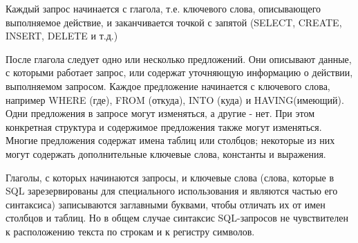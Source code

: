 \documentclass[12pt,a4paper,oneside]{article} %
\begin{document}
Каждый запрос начинается с глагола, т.е. ключевого слова, \linebreak
описывающего выполняемое действие, и заканчивается точкой \linebreak
с запятой (SELECT, CREATE, INSERT, DELETE и т.д.)

После глагола следует одно или несколько предложений. Они описывают \linebreak
данные, с которыми работает запрос, или содержат уточняющую \linebreak
информацию о действии, выполняемом запросом. Каждое \linebreak
предложение начинается с ключевого слова, например WHERE (где), \linebreak
FROM (откуда), INTO (куда) и HAVING(имеющий). Одни предложения \linebreak
в запросе могут изменяться, а другие - нет. При этом конкретная \linebreak
структура и содержимое предложения также могут изменяться. \linebreak
Многие предложения содержат имена таблиц или столбцов; \linebreak
некоторые из них могут содержать дополнительные ключевые слова, \linebreak
константы и выражения.

Глаголы, с которых начинаются запросы, и ключевые слова (слова, \linebreak
которые в SQL зарезервированы для специального использования и \linebreak
являются частью его синтаксиса) записываются заглавными буквами, \linebreak
чтобы отличать их от имен столбцов и таблиц. Но в общем случае \linebreak
синтаксис SQL-запросов не чувствителен к расположению текста \linebreak
по строкам и к регистру символов.
\end{document}
